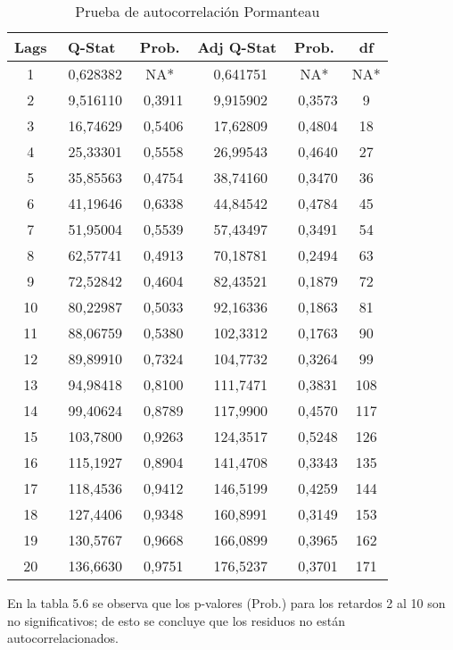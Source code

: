 \begin{table}[H]
\centering
\begin{tabular}{cccccc}\hline\hline
Lags & Q-Stat & Prob. & Adj Q-Stat &  Prob. & df \\ \hline\hline
1 & ~0,628382 & NA* & ~0,641751 & NA* & NA* \\
2 & ~9,516110 & ~0,3911 & ~9,915902 & ~0,3573 & 9 \\
3 & ~16,74629 & ~0,5406 & ~17,62809 & ~0,4804 & 18 \\
4 & ~25,33301 & ~0,5558 & ~26,99543 & ~0,4640 & 27 \\
5 & ~35,85563 & ~0,4754 & ~38,74160 & ~0,3470 & 36 \\
6 & ~41,19646 & ~0,6338 & ~44,84542 & ~0,4784 & 45 \\
7 & ~51,95004 & ~0,5539 & ~57,43497 & ~0,3491 & 54 \\
8 & ~62,57741 & ~0,4913 & ~70,18781 & ~0,2494 & 63 \\
9 & ~72,52842 & ~0,4604 & ~82,43521 & ~0,1879 & 72 \\
10& ~80,22987 & ~0,5033 & ~92,16336 & ~0,1863 & 81 \\
11& ~88,06759 & ~0,5380 & ~102,3312 & ~0,1763 & 90 \\
12& ~89,89910 & ~0,7324 & ~104,7732 & ~0,3264 & 99 \\
13& ~94,98418 & ~0,8100 & ~111,7471 & ~0,3831 & 108 \\
14& ~99,40624 & ~0,8789 & ~117,9900 & ~0,4570 & 117 \\
15& ~103,7800 & ~0,9263 & ~124,3517 & ~0,5248 & 126 \\
16& ~115,1927 & ~0,8904 & ~141,4708 & ~0,3343 & 135 \\
17& ~118,4536 & ~0,9412 & ~146,5199 & ~0,4259 & 144 \\
18& ~127,4406 & ~0,9348 & ~160,8991 & ~0,3149 & 153 \\
19& ~130,5767 & ~0,9668 & ~166,0899 & ~0,3965 & 162 \\
20& ~136,6630 & ~0,9751 & ~176,5237 & ~0,3701 & 171 \\ \hline \hline
\end{tabular}
\caption{Prueba de autocorrelaci\'{o}n Pormanteau}
\label{tab19}
\end{table}

En la tabla 5.6 se observa que los p-valores (Prob.) para los retardos 2 al 10 son no significativos; de esto se concluye que los residuos no est\'{a}n autocorrelacionados.\newline

